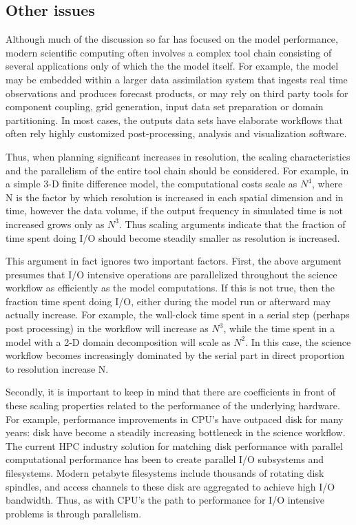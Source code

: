 \subsection{Other issues}\label{sec:toolchain}

	Although much of the discussion so far has focused on the model performance, modern scientific computing often involves a complex tool chain consisting of several applications only of which the the model itself. For example, the model may be embedded within a larger data assimilation system that ingests real time observations and produces forecast products, or may rely on third party tools for component coupling, grid generation, input data set preparation or domain partitioning. In most cases, the outputs data sets have elaborate workflows that often rely highly customized post-processing, analysis and visualization software.


Thus, when planning significant increases in resolution, the scaling characteristics and the parallelism of the entire tool chain should be considered. For example, in a simple 3-D finite difference model, the computational costs scale as $N^4$, where N is the factor by which resolution is increased in each spatial dimension and in time, however the data volume, if the output frequency in simulated time is not increased grows only as $N^3$. Thus scaling arguments indicate that the fraction of time spent doing I/O should become steadily smaller as resolution is increased. 

This argument in fact ignores two important factors. First, the above argument presumes that I/O intensive operations are parallelized throughout the science workflow as efficiently as the model computations. If this is not true, then the fraction time spent doing I/O, either during the model run or afterward may actually increase. For example, the wall-clock time spent in a serial step (perhaps post processing) in the workflow will increase as $N^3$, while the time spent in a model with a 2-D domain decomposition will scale as $N^2$. In this case, the science workflow becomes increasingly dominated by the serial part in direct proportion to resolution increase N.

Secondly, it is important to keep in mind that there are coefficients in front of these scaling properties related to the performance of the underlying hardware. For example, performance improvements in CPU's have outpaced disk for many years: disk have become a steadily increasing bottleneck in the science workflow. The current HPC industry solution for matching disk performance with parallel computational performance  has been to create parallel I/O subsystems and filesystems. Modern petabyte filesystems include thousands of rotating disk spindles, and access channels to these disk are aggregated to achieve high I/O bandwidth. Thus, as with CPU's the path to performance for I/O intensive problems is through parallelism.

